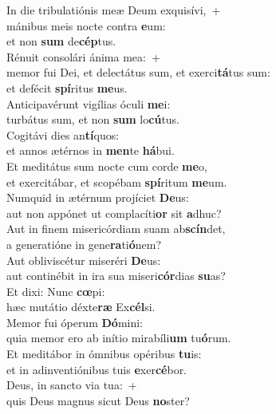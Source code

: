 \evenverse In die tribulatiónis meæ Deum exquisívi,~+\\\evenverse  mánibus meis nocte contra \textbf{e}um:~\*\\
\evenverse et non \textbf{sum} de\textbf{cép}tus.\\
\oddverse Rénuit consolári ánima mea:~+\\
\oddverse  memor fui Dei, et delectátus sum, et exerci\textbf{tá}tus sum:~\*\\
\oddverse et defécit \textbf{spí}ritus \textbf{me}us.\\
\evenverse Anticipavérunt vigílias óculi \textbf{me}i:~\*\\
\evenverse turbátus sum, et non \textbf{sum} lo\textbf{cú}tus.\\
\oddverse Cogitávi dies an\textbf{tí}quos:~\*\\
\oddverse et annos ætérnos in \textbf{men}te \textbf{há}bui.\\
\evenverse Et meditátus sum nocte cum corde \textbf{me}o,~\*\\
\evenverse et exercitábar, et scopébam \textbf{spí}ritum \textbf{me}um.\\
\oddverse Numquid in ætérnum projíciet \textbf{De}us:~\*\\
\oddverse aut non appónet ut complacíti\textbf{or} sit \textbf{a}dhuc?\\
\evenverse Aut in finem misericórdiam suam ab\textbf{scín}det,~\*\\
\evenverse a generatióne in gene\textbf{ra}ti\textbf{ó}nem?\\
\oddverse Aut obliviscétur miseréri \textbf{De}us:~\*\\
\oddverse aut continébit in ira sua miseri\textbf{cór}dias \textbf{su}as?\\
\evenverse Et dixi: Nunc \textbf{cœ}pi:~\*\\
\evenverse hæc mutátio déxte\textbf{ræ} Ex\textbf{cél}si.\\
\oddverse Memor fui óperum \textbf{Dó}mini:~\*\\
\oddverse quia memor ero ab inítio mirabíli\textbf{um} tu\textbf{ó}rum.\\
\evenverse Et meditábor in ómnibus opéribus \textbf{tu}is:~\*\\
\evenverse et in adinventiónibus tuis \textbf{e}xer\textbf{cé}bor.\\
\oddverse Deus, in sancto via tua:~+\\
\oddverse  quis Deus magnus sicut Deus \textbf{no}ster?~\*\\
